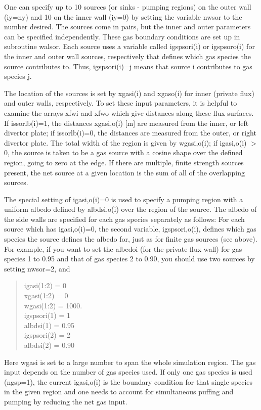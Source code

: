 \documentclass [12pt]{article}
\begin{document}
One can specify up to 10 sources (or sinks - pumping regions) on the outer
wall (iy=ny) and 10 on the inner wall (iy=0) by setting the variable nwsor
to the number desired. The sources come in pairs, but the inner and outer
parameters can be specified independently. These gas boundary conditions
are set up in subroutine walsor.  Each source uses a variable called
igspsori(i) or igspsoro(i) for the inner and outer wall sources, respectively
that defines which gas species the source contributes to.  Thus, igspsori(i)=j
means that source i contributes to gas species j.

The location of the sources is set by xgasi(i) and xgaso(i) for inner (private
flux) and outer walls, respectively.  To set these input parameters, it is
helpful to examine the arrays xfwi and xfwo which give distances along these
flux surfaces. If issorlb(i)=1, the distances xgasi,o(i) [m] are measured from
the inner, or left divertor plate; if issorlb(i)=0, the distances are measured
from the outer, or right divertor plate. The total width of the region is
given by wgasi,o(i); if igasi,o(i) $>$ 0, the source is taken to be a gas
source with a cosine shape over the defined region, going to zero at the edge.
If there are multiple, finite strength sources present, the net source at a
given location is the sum of all of the overlapping sources.

The special setting of igasi,o(i)=0 is used to specify a pumping region with a
uniform albedo defined by albdsi,o(i) over the region of the source.  The
albedo of the side walls are specified for each gas species separately as
follows: For each source which has igasi,o(i)=0, the second variable,
igspsori,o(i), defines which gas species the source defines the albedo for,
just as for finite gas sources (see above). For example, if you want to set
the albedoi (for the private-flux wall) for gas species 1 to 0.95 and that of
gas species 2 to 0.90, you should use two sources by setting nwsor=2, and
\begin{verse} \sf
        igasi(1:2) = 0 \\
        xgasi(1:2) = 0  \\
        wgasi(1:2) = 1000. \\
        igspsori(1) = 1 \\
        albdsi(1) = 0.95 \\
        igspsori(2) = 2 \\
        albdsi(2) = 0.90 
\end{verse}
Here wgasi is set to a large number to span the whole simulation region.
The gas input depends on the number of gas species used. If only one gas
species is used (ngsp=1), the current igasi,o(i) is the boundary condition
for that single species in the given region and one needs to account for
simultaneous puffing and pumping by reducing the net gas input. 
\end{document}
